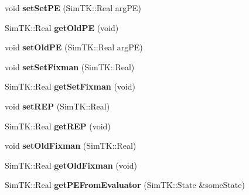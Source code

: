 \begin{DoxyCompactItemize}
\item 
void {\bfseries set\+Set\+PE} (Sim\+T\+K\+::\+Real arg\+PE)\hypertarget{classConformationalSearch_a9e5a5be6a8146f1ea65e4f59495e1dca}{}\label{classConformationalSearch_a9e5a5be6a8146f1ea65e4f59495e1dca}

\item 
Sim\+T\+K\+::\+Real {\bfseries get\+Old\+PE} (void)\hypertarget{classConformationalSearch_a4863b464944280a40272a50ff87ec86f}{}\label{classConformationalSearch_a4863b464944280a40272a50ff87ec86f}

\item 
void {\bfseries set\+Old\+PE} (Sim\+T\+K\+::\+Real arg\+PE)\hypertarget{classConformationalSearch_a80338d2d1862f2d54ccba4fb71cf8d31}{}\label{classConformationalSearch_a80338d2d1862f2d54ccba4fb71cf8d31}

\item 
void {\bfseries set\+Set\+Fixman} (Sim\+T\+K\+::\+Real)\hypertarget{classConformationalSearch_ae2ad62d8cc4a95c0a64acd989e96ca1b}{}\label{classConformationalSearch_ae2ad62d8cc4a95c0a64acd989e96ca1b}

\item 
Sim\+T\+K\+::\+Real {\bfseries get\+Set\+Fixman} (void)\hypertarget{classConformationalSearch_a89f080301b7c62aa1670d5aaa62cda64}{}\label{classConformationalSearch_a89f080301b7c62aa1670d5aaa62cda64}

\item 
void {\bfseries set\+R\+EP} (Sim\+T\+K\+::\+Real)\hypertarget{classConformationalSearch_ae6ee4184dd53516e76a8702c19d613db}{}\label{classConformationalSearch_ae6ee4184dd53516e76a8702c19d613db}

\item 
Sim\+T\+K\+::\+Real {\bfseries get\+R\+EP} (void)\hypertarget{classConformationalSearch_a07c19a37a7842e46d1de3ed3ede0406c}{}\label{classConformationalSearch_a07c19a37a7842e46d1de3ed3ede0406c}

\item 
void {\bfseries set\+Old\+Fixman} (Sim\+T\+K\+::\+Real)\hypertarget{classConformationalSearch_a92745f4bb8f9bcfce042d8f7fe9685dc}{}\label{classConformationalSearch_a92745f4bb8f9bcfce042d8f7fe9685dc}

\item 
Sim\+T\+K\+::\+Real {\bfseries get\+Old\+Fixman} (void)\hypertarget{classConformationalSearch_a0adc7a570887d26e4ac723fe6273ee7c}{}\label{classConformationalSearch_a0adc7a570887d26e4ac723fe6273ee7c}

\item 
Sim\+T\+K\+::\+Real {\bfseries get\+P\+E\+From\+Evaluator} (Sim\+T\+K\+::\+State \&some\+State)\hypertarget{classConformationalSearch_a9cd1201735ce2d42c355d46653336730}{}\label{classConformationalSearch_a9cd1201735ce2d42c355d46653336730}


\end{DoxyCompactItemize}
